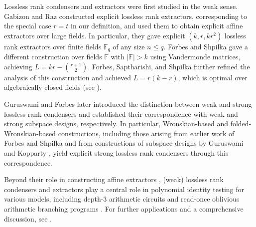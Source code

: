 \documentclass[11pt]{article}
\newcommand{\rank}{\mathrm{rank}}
\newcommand{\F}{\mathbb{F}}
\begin{document}

Lossless rank condensers and extractors were first studied in the weak sense. Gabizon and Raz \cite{GR08} constructed explicit lossless rank extractors, corresponding to the special case $r=t$ in our definition, and used them to obtain explicit affine extractors over large fields. In particular, they gave explicit $(k,r,kr^2)$ lossless rank extractors over finite fields $\F_q$ of any size $n\leq q$. Forbes and Shpilka \cite{FS12} gave a different construction over fields $\F$ with $|\F|>k$ using Vandermonde matrices, achieving $L=kr-\binom{r+1}{2}$. Forbes, Saptharishi, and Shpilka \cite{FSS14} further refined the analysis of this construction and achieved $L=r(k-r)$, which is optimal over algebraically closed fields (see \cite{FZ16,Guo24,brakensiek2025random}).

Guruswami and Forbes \cite{FG15} later introduced the distinction between weak and strong lossless rank condensers and established their correspondence with weak and strong subspace designs, respectively. In particular, Wronskian-based and folded-Wronskian-based constructions, including those arising from earlier work of Forbes and Shpilka \cite{FS12,FSS14} and from constructions of subspace designs by Guruswami and Kopparty \cite{guruswami2016explicit}, yield explicit strong lossless rank condensers through this correspondence.

Beyond their role in constructing affine extractors \cite{GR08}, (weak) lossless rank condensers and extractors play a central role in polynomial identity testing for various models, including depth-3 arithmetic circuits \cite{KS11,KS09,SS13,SS12} and read-once oblivious arithmetic branching programs \cite{FS13,FSS14,AGKS15}. For further applications and a comprehensive discussion, see \cite{FG15}.
\end{document}
